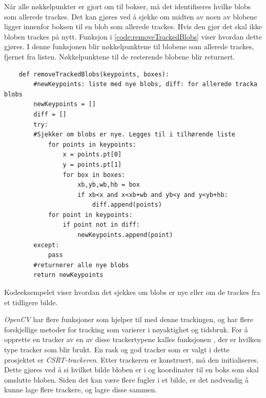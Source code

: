 Når alle nøkkelpunkter er gjort om til bokser, må det identifiseres hvilke blobs som allerede trackes. 
Det kan gjøres ved å sjekke om midten av noen av blobene ligger innenfor boksen til en blob som allerede trackes. 
Hvis den gjør det skal ikke bloben trackes på nytt. 
Funksjon\newline {} i \autoref{code:removeTrackedBlobs} viser hvordan dette gjøres.
I denne funksjonen blir nøkkelpunktene til blobene som allerede trackes, fjernet fra listen. 
Nøkkelpunktene til de resterende blobene blir returnert.

\begin{listing}[!htb]
\begin{verbatim}
    def removeTrackedBlobs(keypoints, boxes):
        #newKeypoints: liste med nye blobs, diff: for allerede tracka blobs
        newKeypoints = []
        diff = []
        try:
        #Sjekker om blobs er nye. Legges til i tilhørende liste
            for points in keypoints:
                x = points.pt[0]
                y = points.pt[1]
                for box in boxes:
                    xb,yb,wb,hb = box
                    if xb<x and x<xb+wb and yb<y and y<yb+hb:
                        diff.append(points)
            for point in keypoints:
                if point not in diff:
                    newKeypoints.append(point)
        except:
            pass
        #returnerer alle nye blobs
        return newKeypoints
\end{verbatim}
\caption{Kodeeksempelet viser hvordan det sjekkes om blobs er nye eller om de trackes fra et tidligere bilde.}
\label{code:removeTrackedBlobs}
\end{listing}

\textit{OpenCV} har flere funksjoner som hjelper til med denne trackingen, og har flere forskjellige metoder for tracking som varierer i nøyaktighet og tidsbruk.
For å opprette en tracker av en av disse trackertypene kalles funksjonen , der  er hvilken type tracker som blir brukt. En rask og god tracker som er valgt i dette prosjektet er \textit{CSRT-trackeren}. 
Etter trackeren er konstruert, må den initialiseres.
Dette gjøres ved å si hvilket bilde bloben er i og koordinater til en boks som skal omslutte bloben. 
Siden det kan være flere fugler i et bilde, er det nødvendig å kunne lage flere trackere, og lagre disse sammen.

